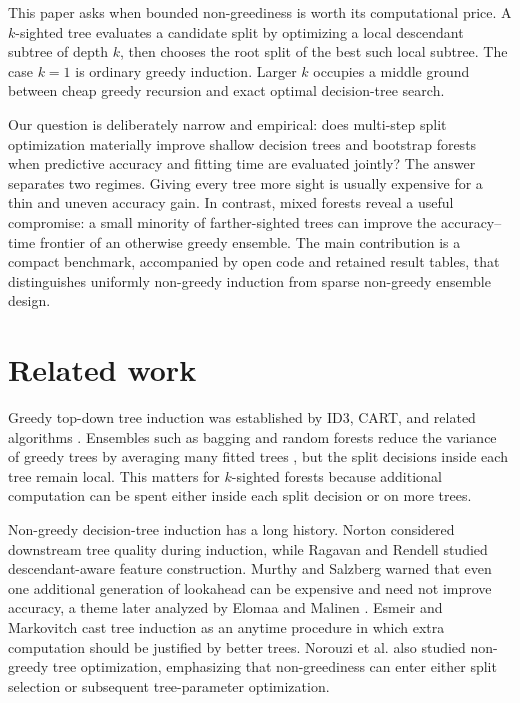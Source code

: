 \documentclass[final,5p,times]{elsarticle}
\begin{document}
This paper asks when bounded non-greediness is worth its computational price. A $k$-sighted tree evaluates a candidate split by optimizing a local descendant subtree of depth $k$, then chooses the root split of the best such local subtree. The case $k=1$ is ordinary greedy induction. Larger $k$ occupies a middle ground between cheap greedy recursion and exact optimal decision-tree search.

Our question is deliberately narrow and empirical: does multi-step split optimization materially improve shallow decision trees and bootstrap forests when predictive accuracy and fitting time are evaluated jointly? The answer separates two regimes. Giving every tree more sight is usually expensive for a thin and uneven accuracy gain. In contrast, mixed forests reveal a useful compromise: a small minority of farther-sighted trees can improve the accuracy--time frontier of an otherwise greedy ensemble. The main contribution is a compact benchmark, accompanied by open code and retained result tables, that distinguishes uniformly non-greedy induction from sparse non-greedy ensemble design.

\section{Related work}

Greedy top-down tree induction was established by ID3, CART, and related algorithms \cite{quinlan1986induction,breiman1984cart}. Ensembles such as bagging and random forests reduce the variance of greedy trees by averaging many fitted trees \cite{breiman1996bagging,breiman2001random}, but the split decisions inside each tree remain local. This matters for $k$-sighted forests because additional computation can be spent either inside each split decision or on more trees.

Non-greedy decision-tree induction has a long history. Norton \cite{norton1989generating} considered downstream tree quality during induction, while Ragavan and Rendell \cite{ragavan1993lookahead} studied descendant-aware feature construction. Murthy and Salzberg \cite{murthy1995lookahead} warned that even one additional generation of lookahead can be expensive and need not improve accuracy, a theme later analyzed by Elomaa and Malinen \cite{elomaa2005lookahead}. Esmeir and Markovitch \cite{esmeir2007anytime} cast tree induction as an anytime procedure in which extra computation should be justified by better trees. Norouzi et al. \cite{norouzi2015efficient} also studied non-greedy tree optimization, emphasizing that non-greediness can enter either split selection or subsequent tree-parameter optimization.
\end{document}
